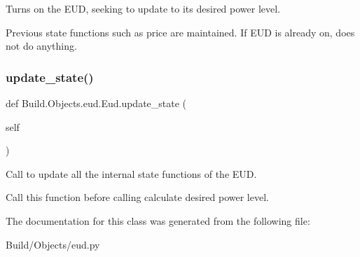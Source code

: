Turns on the E\+UD, seeking to update to its desired power level. 

Previous state functions such as price are maintained. If E\+UD is already on, does not do anything. \mbox{\label{class_build_1_1_objects_1_1eud_1_1_eud_ac807e57f20360c9e828046a38aaa7db6}} 
\subsubsection{\texorpdfstring{update\+\_\+state()}{update\_state()}}
{\footnotesize\ttfamily def Build.\+Objects.\+eud.\+Eud.\+update\+\_\+state (\begin{DoxyParamCaption}\item[{}]{self }\end{DoxyParamCaption})}



Call to update all the internal state functions of the E\+UD. 

Call this function before calling calculate desired power level. 

The documentation for this class was generated from the following file\+:\begin{DoxyCompactItemize}
\item 
Build/\+Objects/eud.\+py\end{DoxyCompactItemize}
